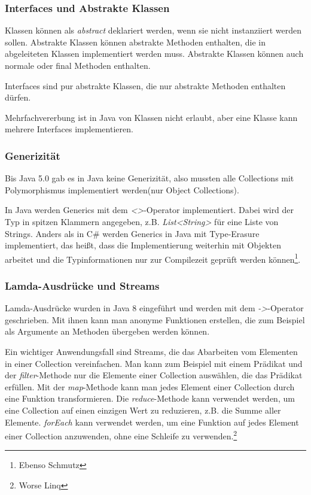 \documentclass[12pt]{scrartcl}
\begin{document}
\subsubsection{Interfaces und Abstrakte Klassen}

Klassen können als \emph{abstract} deklariert werden, wenn sie nicht instanziiert werden sollen.
Abstrakte Klassen können abstrakte Methoden enthalten, die in abgeleiteten Klassen implementiert werden
muss. Abstrakte Klassen können auch normale oder final Methoden enthalten.

Interfaces sind pur abstrakte Klassen, die nur abstrakte Methoden enthalten dürfen.

Mehrfachvererbung ist in Java von Klassen nicht erlaubt, aber eine Klasse kann
mehrere Interfaces implementieren.

\subsubsection{Generizität}

Bis Java 5.0 gab es in Java keine Generizität, also mussten alle Collections mit Polymorphismus
implementiert werden(nur Object Collections).

In Java werden Generics mit dem \emph{<>}-Operator
implementiert. Dabei wird der Typ in spitzen Klammern angegeben, z.B. \emph{List<String>}
für eine Liste von Strings. Anders als in C\# werden Generics in Java mit Type-Erasure implementiert,
das heißt, dass die Implementierung weiterhin mit Objekten arbeitet und die Typinformationen
nur zur Compilezeit geprüft werden können\footnote{Ebenso Schmutz}.


\subsubsection{Lamda-Ausdrücke und Streams}

Lamda-Ausdrücke wurden in Java 8 eingeführt und werden mit dem
\emph{->}-Operator geschrieben. Mit ihnen kann man anonyme Funktionen
erstellen, die zum Beispiel als Argumente an Methoden übergeben werden können.

Ein wichtiger Anwendungsfall sind Streams, die das Abarbeiten vom Elementen
in einer Collection vereinfachen. Man kann zum Beispiel mit einem Prädikat
und der \emph{filter}-Methode nur die Elemente einer Collection
auswählen, die das Prädikat erfüllen. Mit der \emph{map}-Methode kann man
jedes Element einer Collection durch eine Funktion transformieren.
Die \emph{reduce}-Methode kann verwendet werden, um eine Collection auf einen
einzigen Wert zu reduzieren, z.B. die Summe aller Elemente. \emph{forEach}
kann verwendet werden, um eine Funktion auf jedes Element einer Collection
anzuwenden, ohne eine Schleife zu verwenden.\footnote{Worse Linq}
\end{document}
